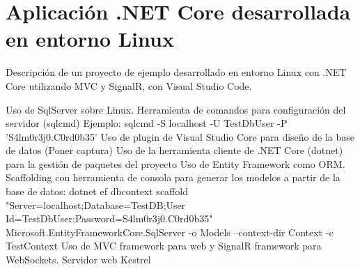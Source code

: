 \section{Aplicación .NET Core desarrollada en entorno Linux}
Descripción de un proyecto de ejemplo desarrollado en entorno Linux con .NET Core utilizando MVC y SignalR, con Visual Studio Code.

Uso de SqlServer sobre Linux. Herramienta de comandos para configuración del servidor (sqlcmd)
Ejemplo: sqlcmd -S localhost -U TestDbUser -P 'S4lm0r3j0.C0rd0b35'
Uso de plugin de Visual Studio Core para diseño de la base de datos (Poner captura)
Uso de la herramienta cliente de .NET Core (dotnet) para la gestión de paquetes del proyecto
Uso de Entity Framework como ORM. Scaffolding con herramienta de consola para generar los modelos a partir de la base de datos: dotnet ef dbcontext scaffold "Server=localhost;Database=TestDB;User Id=TestDbUser;Password=S4lm0r3j0.C0rd0b35" Microsoft.EntityFrameworkCore.SqlServer -o Models --context-dir Context -c TestContext
Uso de MVC framework para web y SignalR framework para WebSockets.
Servidor web Kestrel